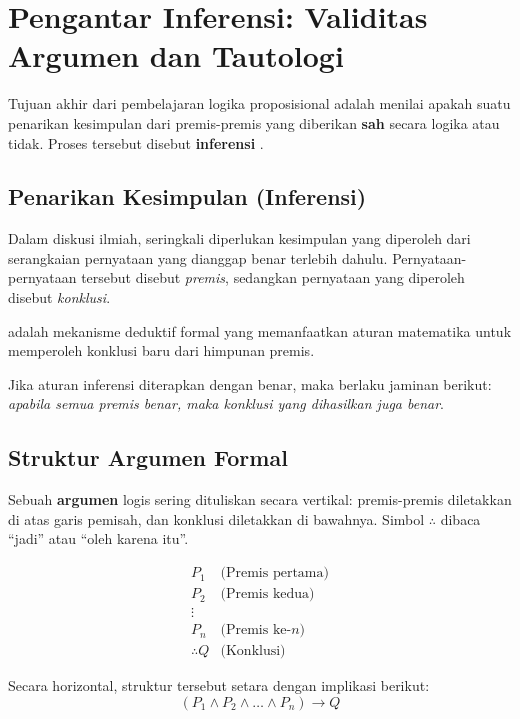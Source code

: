 \section{Pengantar Inferensi: Validitas Argumen dan Tautologi}

Tujuan akhir dari pembelajaran logika proposisional adalah menilai apakah suatu penarikan kesimpulan dari premis-premis yang diberikan \textbf{sah} secara logika atau tidak. Proses tersebut disebut \textbf{inferensi} \cite{rosen2019}.

\subsection{Penarikan Kesimpulan (Inferensi)}

Dalam diskusi ilmiah, seringkali diperlukan kesimpulan yang diperoleh dari serangkaian pernyataan yang dianggap benar terlebih dahulu. Pernyataan-pernyataan tersebut disebut \textit{premis}, sedangkan pernyataan yang diperoleh disebut \textit{konklusi}.

\begin{definisi}
 adalah mekanisme deduktif formal yang memanfaatkan aturan matematika untuk memperoleh konklusi baru dari himpunan premis.
\end{definisi}

Jika aturan inferensi diterapkan dengan benar, maka berlaku jaminan berikut: \textit{apabila semua premis benar, maka konklusi yang dihasilkan juga benar}.

\subsection{Struktur Argumen Formal}

Sebuah \textbf{argumen} logis sering dituliskan secara vertikal: premis-premis diletakkan di atas garis pemisah, dan konklusi diletakkan di bawahnya. Simbol $\therefore$ dibaca ``jadi'' atau ``oleh karena itu''.

\[
\begin{array}{ll}
P_1 & \text{(Premis pertama)} \\
P_2 & \text{(Premis kedua)} \\
\vdots & \\
P_n & \text{(Premis ke-} n) \\
\hline
\therefore Q & \text{(Konklusi)}
\end{array}
\]

Secara horizontal, struktur tersebut setara dengan implikasi berikut:
\[ (P_1 \wedge P_2 \wedge \ldots \wedge P_n) \rightarrow Q \]

